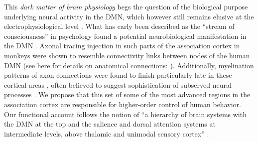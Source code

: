 \documentclass[10pt,letterpaper]{article}
\begin{document}
This \textit{dark matter of brain physiology}
\citep{raichle2006brain} begs the question
of the biological purpose underlying neural activity in the DMN,
which however still remains elusive at the electrophysiological level
\citep{de2010temporal,brookes2011investigating,baker2014fast}.
What has early been described as the ``stream of consciousness''
in psychology \citep{james1890principles}
found a potential neurobiological manifestation
in the DMN
\citep{shul1997, raichle2001pnas}.
%
Axonal tracing injection in such parts of the association cortex in monkeys
were shown to resemble connectivity links between nodes of the human
DMN (see here for details on anatomical connections: \citep{randy2008}).
Additionally, myelination patterns of axon connections were found to finish
particularly late in these cortical areas \citep{flechsig1920}, often believed to suggest
sophistication of subserved neural processes
\citep{Sowell2003, Yakovlev1967}.
%
We propose that this set of some of the most advanced regions in
the association cortex \citep{mesulam1998sensation, margulies2016situating}
are responsible for higher-order control of human behavior.
Our functional account follows the notion of
``a hierarchy of brain systems with
the DMN at the top and the salience and dorsal attention systems
at intermediate levels, above thalamic and unimodal sensory
cortex'' \citep{carhart2010default}.
\end{document}
